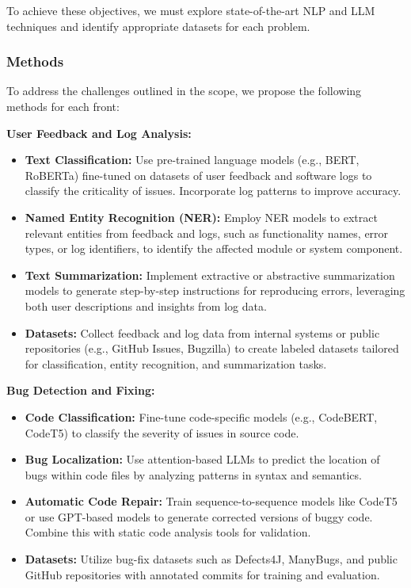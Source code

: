 \documentclass[12pt]{article}
\begin{document}
To achieve these objectives, we must explore state-of-the-art NLP and LLM techniques and identify appropriate datasets for each problem.

\subsubsection*{Methods}

To address the challenges outlined in the scope, we propose the following methods for each front:

\textbf{User Feedback and Log Analysis:} 
\begin{itemize} 
    \item \textbf{Text Classification:} Use pre-trained language models (e.g., BERT, RoBERTa) fine-tuned on datasets of user feedback and software logs to classify the criticality of issues. Incorporate log patterns to improve accuracy.
    \item \textbf{Named Entity Recognition (NER):} Employ NER models to extract relevant entities from feedback and logs, such as functionality names, error types, or log identifiers, to identify the affected module or system component.
    \item \textbf{Text Summarization:} Implement extractive or abstractive summarization models to generate step-by-step instructions for reproducing errors, leveraging both user descriptions and insights from log data.
    \item \textbf{Datasets:} Collect feedback and log data from internal systems or public repositories (e.g., GitHub Issues, Bugzilla) to create labeled datasets tailored for classification, entity recognition, and summarization tasks.
\end{itemize}

\textbf{Bug Detection and Fixing:} 
\begin{itemize} 
\item \textbf{Code Classification:} Fine-tune code-specific models (e.g., CodeBERT, CodeT5) to classify the severity of issues in source code. 
\item \textbf{Bug Localization:} Use attention-based LLMs to predict the location of bugs within code files by analyzing patterns in syntax and semantics. 
\item \textbf{Automatic Code Repair:} Train sequence-to-sequence models like CodeT5 or use GPT-based models to generate corrected versions of buggy code. Combine this with static code analysis tools for validation. 
\item \textbf{Datasets:} Utilize bug-fix datasets such as Defects4J, ManyBugs, and public GitHub repositories with annotated commits for training and evaluation. \end{itemize}
\end{document}

